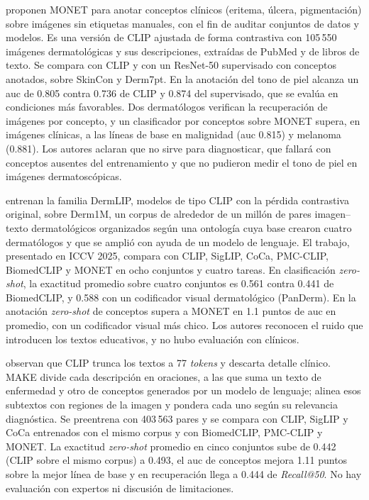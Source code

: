 \textcite{kim2024transparent} proponen MONET para anotar conceptos clínicos (eritema, úlcera, pigmentación) sobre
imágenes sin etiquetas manuales, con el fin de auditar conjuntos de datos y modelos. Es una versión de CLIP ajustada
de forma contrastiva con 105\,550 imágenes dermatológicas y sus descripciones, extraídas de PubMed y de libros de
texto. Se compara con CLIP y con un ResNet-50 supervisado con conceptos anotados, sobre SkinCon y Derm7pt. En la
anotación del tono de piel alcanza un \gls{auc} de 0.805 contra 0.736 de CLIP y 0.874 del supervisado, que se evalúa
en condiciones más favorables. Dos dermatólogos verifican la recuperación de imágenes por concepto, y un clasificador
por conceptos sobre MONET supera, en imágenes clínicas, a las líneas de base en malignidad (\gls{auc} 0.815) y melanoma (0.881). Los autores
aclaran que no sirve para diagnosticar, que fallará con conceptos ausentes del entrenamiento y que no pudieron medir
el tono de piel en imágenes dermatoscópicas.

\textcite{yan2025derm1miccv} entrenan la familia DermLIP, modelos de tipo CLIP con la pérdida contrastiva original, sobre
Derm1M, un corpus de alrededor de un millón de pares imagen--texto dermatológicos organizados según una ontología
cuya base crearon cuatro dermatólogos y que se amplió con ayuda de un modelo de lenguaje. El trabajo, presentado en ICCV 2025, compara con CLIP, SigLIP,
CoCa, PMC-CLIP, BiomedCLIP y MONET en ocho conjuntos y cuatro tareas. En clasificación \emph{zero-shot}, la
exactitud promedio sobre cuatro conjuntos es 0.561 contra 0.441 de BiomedCLIP, y 0.588 con un codificador visual
dermatológico (PanDerm). En la anotación \emph{zero-shot} de conceptos supera a MONET en 1.1 puntos de \gls{auc} en promedio, con
un codificador visual más chico. Los autores reconocen el ruido que introducen los textos educativos, y no hubo evaluación con
clínicos.

\textcite{yan2025makemiccai} observan que CLIP trunca los textos a 77 \emph{tokens} y descarta detalle clínico. MAKE
divide cada descripción en oraciones, a las que suma un texto de enfermedad y otro de conceptos generados por un
modelo de lenguaje; alinea esos subtextos con regiones de la imagen y pondera cada uno según su relevancia
diagnóstica. Se preentrena con 403\,563 pares y se compara con CLIP, SigLIP y CoCa entrenados con el mismo
corpus y con BiomedCLIP, PMC-CLIP y MONET. La exactitud \emph{zero-shot} promedio en cinco conjuntos sube de 0.442
(CLIP sobre el mismo corpus) a 0.493, el \gls{auc} de conceptos mejora 1.11 puntos sobre la mejor línea de base y en
recuperación llega a 0.444 de \emph{Recall@50}. No hay evaluación con expertos ni discusión de limitaciones.

